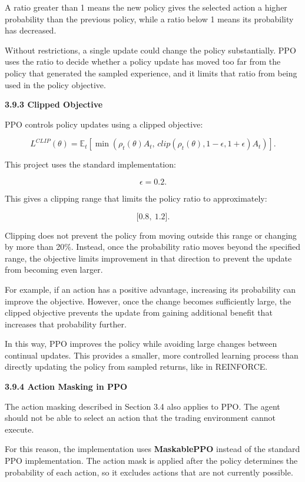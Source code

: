 A ratio greater than 1 means the new policy gives the selected action a
higher probability than the previous policy, while a ratio below 1 means
its probability has decreased.

Without restrictions, a single update could change the policy
substantially. PPO uses the ratio to decide whether a policy update has
moved too far from the policy that generated the sampled experience, and
it limits that ratio from being used in the policy objective.

\textbf{3.9.3 Clipped Objective}

PPO controls policy updates using a clipped objective:

\[L^{CLIP}(\theta) = \mathbb{E}_{t}\left\lbrack \min\left( \rho_{t}(\theta)A_{t},\,{clip}\left( \rho_{t}(\theta),1 - \epsilon,1 + \epsilon \right)A_{t} \right) \right\rbrack.\]

This project uses the standard implementation:

\[\epsilon = 0.2.\]

This gives a clipping range that limits the policy ratio to
approximately:

\[\lbrack 0.8,\ 1.2\rbrack.\]

Clipping does not prevent the policy from moving outside this range or
changing by more than 20\%. Instead, once the probability ratio moves
beyond the specified range, the objective limits improvement in that
direction to prevent the update from becoming even larger.

For example, if an action has a positive advantage, increasing its
probability can improve the objective. However, once the change becomes
sufficiently large, the clipped objective prevents the update from
gaining additional benefit that increases that probability further.

In this way, PPO improves the policy while avoiding large changes
between continual updates. This provides a smaller, more controlled
learning process than directly updating the policy from sampled returns,
like in REINFORCE.

\textbf{3.9.4 Action Masking in PPO}

The action masking described in Section 3.4 also applies to PPO. The
agent should not be able to select an action that the trading
environment cannot execute.

For this reason, the implementation uses \textbf{MaskablePPO} instead of
the standard PPO implementation. The action mask is applied after the
policy determines the probability of each action, so it excludes actions
that are not currently possible.

